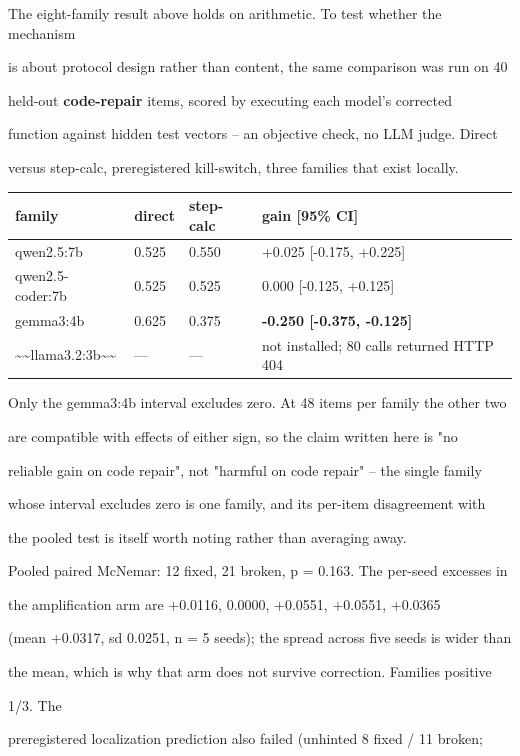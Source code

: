 \documentclass[11pt]{article}
\begin{document}
The eight-family result above holds on arithmetic. To test whether the mechanism

is about protocol design rather than content, the same comparison was run on 40

held-out {\bf code-repair} items, scored by executing each model's corrected

function against hidden test vectors -- an objective check, no LLM judge. Direct

versus step-calc, preregistered kill-switch, three families that exist locally.


\begin{center}\small\begin{tabular}{llll}\hline
family & direct & step-calc & gain [95\% CI] \\
\hline
qwen2.5:7b & 0.525 & 0.550 & +0.025 [-0.175, +0.225] \\
qwen2.5-coder:7b & 0.525 & 0.525 & 0.000 [-0.125, +0.125] \\
gemma3:4b & 0.625 & 0.375 & {\bf -0.250 [-0.375, -0.125]} \\
\textasciitilde{}\textasciitilde{}llama3.2:3b\textasciitilde{}\textasciitilde{} & --- & --- & not installed; 80 calls returned HTTP 404 \\
\end{tabular}\end{center}

Only the gemma3:4b interval excludes zero. At 48 items per family the other two

are compatible with effects of either sign, so the claim written here is "no

reliable gain on code repair", not "harmful on code repair" -- the single family

whose interval excludes zero is one family, and its per-item disagreement with

the pooled test is itself worth noting rather than averaging away.


Pooled paired McNemar: 12 fixed, 21 broken, p = 0.163. The per-seed excesses in

the amplification arm are +0.0116, 0.0000, +0.0551, +0.0551, +0.0365

(mean +0.0317, sd 0.0251, n = 5 seeds); the spread across five seeds is wider than

the mean, which is why that arm does not survive correction. Families positive

1/3. The

preregistered localization prediction also failed (unhinted 8 fixed / 11 broken;
\end{document}
